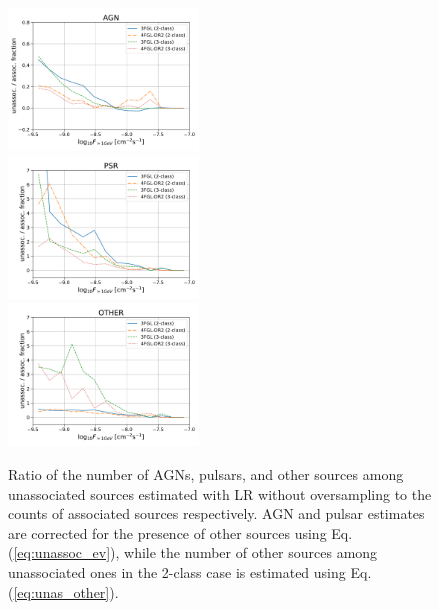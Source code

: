 \begin{figure}[h]
\centering
\includegraphics[width=0.45\textwidth]{plots/N_logS_diff_AGN.pdf} \\
\includegraphics[width=0.45\textwidth]{plots/N_logS_diff_PSR.pdf} \\
\includegraphics[width=0.45\textwidth]{plots/N_logS_diff_OTHER.pdf}
\caption{Ratio of the number of AGNs, pulsars, and other sources among unassociated sources estimated with LR without oversampling
to the counts of associated sources respectively.
AGN and pulsar estimates are corrected for the presence of other sources using Eq. (\ref{eq:unassoc_ev}),
while the number of other sources among unassociated ones in the 2-class case is estimated using Eq. (\ref{eq:unas_other}).
} 
\label{fig:unass_vs_ass_frac}
\end{figure}


